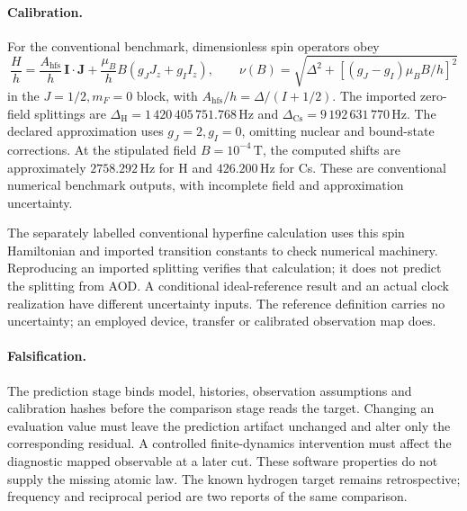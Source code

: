 \paragraph{Calibration.}
For the conventional benchmark, dimensionless spin operators obey
\begin{equation}
\frac{H}{h}=\frac{A_{\mathrm{hfs}}}{h}\,\boldsymbol I\mathbin{\cdot}\boldsymbol J
+\frac{\mu_B}{h}B(g_JJ_z+g_II_z),\qquad
\nu(B)=\sqrt{\Delta^2+\left[(g_J-g_I)\mu_BB/h\right]^2}
\label{eq:manual2-conventional-benchmark}
\end{equation}
in the \(J=1/2,m_F=0\) block, with \(A_{\mathrm{hfs}}/h=\Delta/(I+1/2)\). The imported zero-field splittings are \(\Delta_{\mathrm H}=1\,420\,405\,751.768\,\mathrm{Hz}\) and \(\Delta_{\mathrm{Cs}}=9\,192\,631\,770\,\mathrm{Hz}\). The declared approximation uses \(g_J=2,g_I=0\), omitting nuclear and bound-state corrections. At the stipulated field \(B=10^{-4}\,\mathrm T\), the computed shifts are approximately \(2758.292\,\mathrm{Hz}\) for H and \(426.200\,\mathrm{Hz}\) for Cs. These are conventional numerical benchmark outputs, with incomplete field and approximation uncertainty.

The separately labelled conventional hyperfine calculation uses this spin Hamiltonian and imported transition constants to check numerical machinery. Reproducing an imported splitting verifies that calculation; it does not predict the splitting from AOD. A conditional ideal-reference result and an actual clock realization have different uncertainty inputs. The reference definition carries no uncertainty; an employed device, transfer or calibrated observation map does.

\paragraph{Falsification.}
The prediction stage binds model, histories, observation assumptions and calibration hashes before the comparison stage reads the target. Changing an evaluation value must leave the prediction artifact unchanged and alter only the corresponding residual. A controlled finite-dynamics intervention must affect the diagnostic mapped observable at a later cut. These software properties do not supply the missing atomic law. The known hydrogen target remains retrospective; frequency and reciprocal period are two reports of the same comparison.


